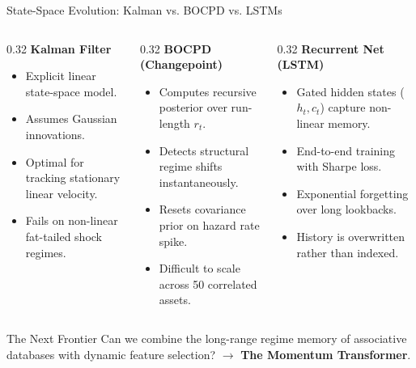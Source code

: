 \documentclass[10pt]{beamer}
\begin{document}
\begin{frame}{State-Space Evolution: Kalman vs. BOCPD vs. LSTMs}
  \begin{columns}[t]
    \begin{column}{0.32\textwidth}
      \textbf{\scriptsize Kalman Filter}
      \begin{itemize}\tiny
        \item Explicit linear state-space model.
        \item Assumes Gaussian innovations.
        \item Optimal for tracking stationary linear velocity.
        \item Fails on non-linear fat-tailed shock regimes.
      \end{itemize}
    \end{column}
    \begin{column}{0.32\textwidth}
      \textbf{\scriptsize BOCPD (Changepoint)}
      \begin{itemize}\tiny
        \item Computes recursive posterior over run-length $r_t$.
        \item Detects structural regime shifts instantaneously.
        \item Resets covariance prior on hazard rate spike.
        \item Difficult to scale across 50 correlated assets.
      \end{itemize}
    \end{column}
    \begin{column}{0.32\textwidth}
      \textbf{\scriptsize Recurrent Net (LSTM)}
      \begin{itemize}\tiny
        \item Gated hidden states ($h_t, c_t$) capture non-linear memory.
        \item End-to-end training with Sharpe loss.
        \item Exponential forgetting over long lookbacks.
        \item History is overwritten rather than indexed.
      \end{itemize}
    \end{column}
  \end{columns}
  \vspace{0.2cm}
  \begin{block}{The Next Frontier}
    Can we combine the long-range regime memory of associative databases with dynamic feature selection? $\longrightarrow$ \textbf{The Momentum Transformer}.
  \end{block}
\end{frame}
\end{document}
